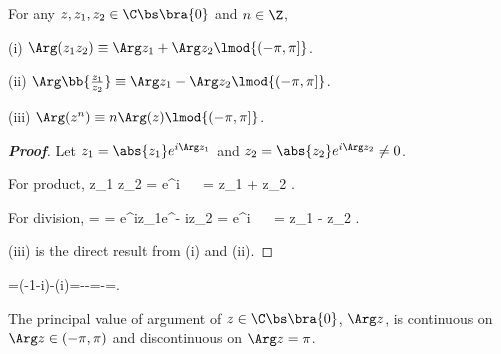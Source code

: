 \begin{proposition}
For any $z,z_1,z_2\in \C\bs\bra{0}$ and $n\in \Z$,
\ben
\item [(i)] $\Arg(z_1z_2) \equiv \Arg z_1 + \Arg z_2 \lmod{(-\pi,\pi]}$.
\item [(ii)] $\Arg\bb{\frac{z_1}{z_2}} \equiv \Arg z_1 - \Arg z_2 \lmod{(-\pi,\pi]}$.
\item [(iii)] $\Arg(z^n) \equiv n\Arg(z)\lmod{(-\pi,\pi]}$.
\een
\end{proposition}


\begin{proof}[\bf Proof]
Let $z_1 = \abs{z_1}e^{i\Arg z_1}$ and $z_2 = \abs{z_2}e^{i\Arg z_2} \neq 0$. 

For product,
\beast
z_1 z_2 = e^{i}  \ \ra\ \Arg{} = \Arg z_1 + \Arg z_2 \lmod{(-\pi,\pi]}.
\eeast

For division,
\beast
{} =  = e^{i\Arg z_1}e^{- i\Arg z_2} = e^{i}  \ \ra\ \Arg{} = \Arg z_1 - \Arg z_2 \lmod{(-\pi,\pi]}.
\eeast

(iii) is the direct result from (i) and (ii).
\end{proof}

\begin{example}
\be
{}=(-1-i)-(i)=-{}-{}=-{}={}{\pmod  {(-\pi ,\pi ]}}.
\ee
\end{example}



\begin{theorem}\label{thm:principal_value_argument_continuous_discontinuous}
The principal value of argument of $z\in \C\bs\bra{0}$, $\Arg z$, is continuous on $\Arg z\in (-\pi,\pi)$ and discontinuous on $\Arg z = \pi$.
\end{theorem}

